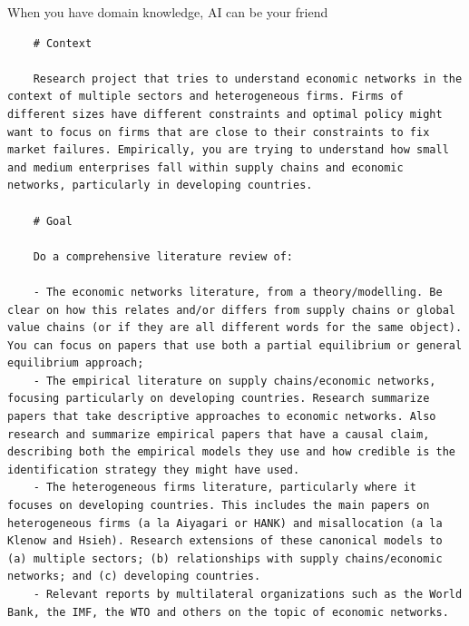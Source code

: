 \documentclass[notes,11pt, aspectratio=169, xcolor=table]{beamer}
\begin{document}
\begin{frame}[fragile=singleslide]{When you have domain knowledge, AI can be your friend}

\begin{verbatim}
    # Context 
    
    Research project that tries to understand economic networks in the context of multiple sectors and heterogeneous firms. Firms of different sizes have different constraints and optimal policy might want to focus on firms that are close to their constraints to fix market failures. Empirically, you are trying to understand how small and medium enterprises fall within supply chains and economic networks, particularly in developing countries.
    
    # Goal
    
    Do a comprehensive literature review of:
    
    - The economic networks literature, from a theory/modelling. Be clear on how this relates and/or differs from supply chains or global value chains (or if they are all different words for the same object). You can focus on papers that use both a partial equilibrium or general equilibrium approach;
    - The empirical literature on supply chains/economic networks, focusing particularly on developing countries. Research summarize papers that take descriptive approaches to economic networks. Also research and summarize empirical papers that have a causal claim, describing both the empirical models they use and how credible is the identification strategy they might have used.
    - The heterogeneous firms literature, particularly where it focuses on developing countries. This includes the main papers on heterogeneous firms (a la Aiyagari or HANK) and misallocation (a la Klenow and Hsieh). Research extensions of these canonical models to (a) multiple sectors; (b) relationships with supply chains/economic networks; and (c) developing countries.
    - Relevant reports by multilateral organizations such as the World Bank, the IMF, the WTO and others on the topic of economic networks.
\end{verbatim}


    
\end{frame}
\end{document}

